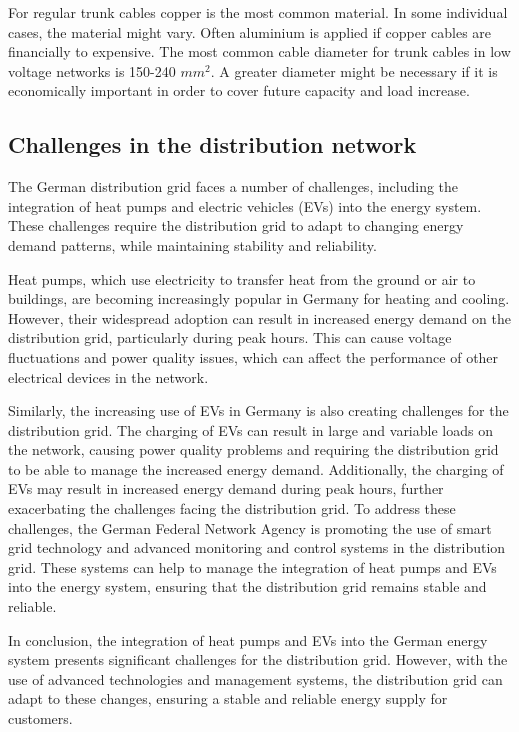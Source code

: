 For regular trunk cables copper is the most common material. In some individual cases, the material might vary. Often aluminium is applied if copper cables are financially to expensive. The most common cable diameter for trunk cables in low voltage networks is 150-240 $mm^2$. A greater diameter might be necessary if it is economically important in order to cover future capacity and load increase. %

\subsection{Challenges in the distribution network}
The German distribution grid faces a number of challenges, including the integration of heat pumps and electric vehicles (EVs) into the energy system. These challenges require the distribution grid to adapt to changing energy demand patterns, while maintaining stability and reliability.

Heat pumps, which use electricity to transfer heat from the ground or air to buildings, are becoming increasingly popular in Germany for heating and cooling. However, their widespread adoption can result in increased energy demand on the distribution grid, particularly during peak hours. This can cause voltage fluctuations and power quality issues, which can affect the performance of other electrical devices in the network.

Similarly, the increasing use of EVs in Germany is also creating challenges for the distribution grid. The charging of EVs can result in large and variable loads on the network, causing power quality problems and requiring the distribution grid to be able to manage the increased energy demand. Additionally, the charging of EVs may result in increased energy demand during peak hours, further exacerbating the challenges facing the distribution grid. To address these challenges, the German Federal Network Agency is promoting the use of smart grid technology and advanced monitoring and control systems in the distribution grid. These systems can help to manage the integration of heat pumps and EVs into the energy system, ensuring that the distribution grid remains stable and reliable.

In conclusion, the integration of heat pumps and EVs into the German energy system presents significant challenges for the distribution grid. However, with the use of advanced technologies and management systems, the distribution grid can adapt to these changes, ensuring a stable and reliable energy supply for customers.

